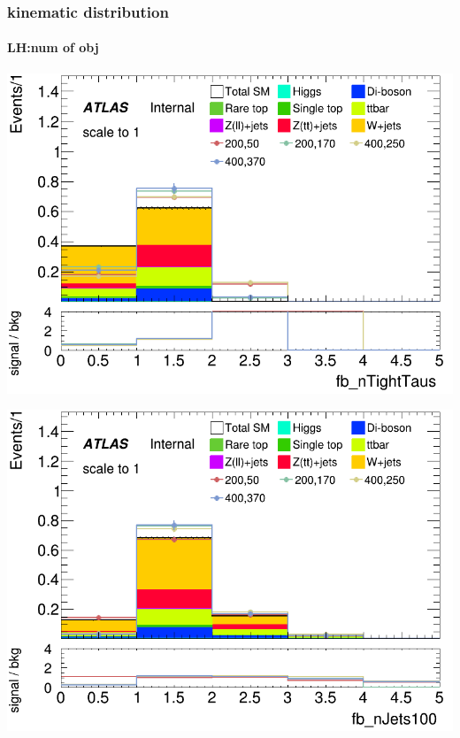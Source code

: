 \documentclass[usenames,dvipsnames]{beamer}
\begin{document}
\begin{frame}
\begin{minipage}{0.2\textwidth}
    \end{minipage}
\end{frame}

\begin{frame}
	\frametitle{kinematic distribution}
	\framesubtitle{LH:num of obj}
	    \begin{minipage}{0.25\textwidth}
        \centering
        \includegraphics[width=\textwidth]{graphics/LH_met_sig/LH_fb_nTightTaus_norm.png}
    \end{minipage}
    \hfill
    \begin{minipage}{0.25\textwidth}
        \centering
        \includegraphics[width=\textwidth]{graphics/LH_met_sig/LH_fb_nJets100_norm.png}
    \end{minipage}
    \hfill
    \begin{minipage}{0.25\textwidth}

\end{minipage}
\end{frame}
\end{document}
